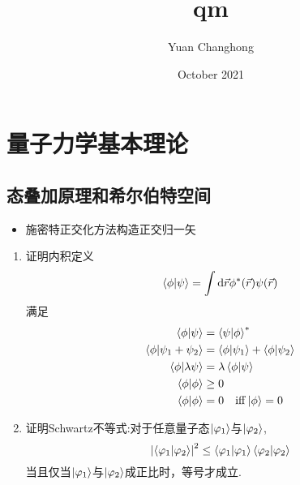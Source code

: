 \documentclass{article}
\title{qm}
\author{Yuan Changhong }
\date{October 2021}
\begin{document}
\maketitle
\section{量子力学基本理论}
\subsection{态叠加原理和希尔伯特空间}
\begin{itemize}
    \item 施密特正交化方法构造正交归一矢
\end{itemize}
\begin{enumerate}
    \item 
    证明内积定义
\begin{equation}
    \braket{\phi}{\psi}=\int{\rm d}\vec{r}\phi^*(\vec{r})\psi(\vec{r})
\end{equation}
满足
\begin{align}
    \braket{\phi}{\psi} & =\braket{\psi}{\phi}^*\\
    \braket{\phi}{\psi_1+\psi_2} & =\braket{\phi}{\psi_1}+\braket{\phi}{\psi_2}\\
    \braket{\phi}{\lambda\psi} &=\lambda\braket{\phi}{\psi}\\
    \braket{\phi}{\phi} & \geq0\\
    \braket{\phi}{\phi} & =0\quad {\rm iff}\ket{\phi}=0
\end{align}
    \item
    证明Schwartz不等式:对于任意量子态$\ket{\varphi_1}$与$\ket{\varphi_2}$,
    \begin{equation}
    \abs{\braket{\varphi_1}{\varphi_2}}^2\leq\braket{\varphi_1}{\varphi_1}\braket{\varphi_2}{\varphi_2}
    \end{equation}
    当且仅当$\ket{\varphi_1}$与$\ket{\varphi_2}$成正比时，等号才成立.
    

\end{enumerate}
\end{document}
